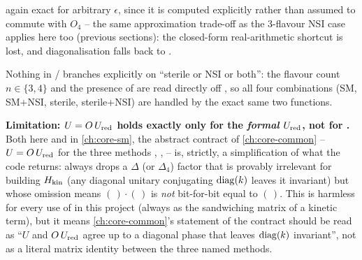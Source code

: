 \begin{theorybox}
\begin{itemize}
\begin{equation}
    \end{equation}
    again exact for arbitrary $\epsilon$, since it is computed explicitly
    rather than assumed to commute with $O_4$ -- the same approximation
    trade-off as the 3-flavour NSI case applies here too (previous
    sections): the closed-form real-arithmetic shortcut is lost, and
    diagonalisation falls back to .
\end{itemize}
Nothing in /
branches explicitly on ``sterile or NSI or both'': the flavour count
$n\in\{3,4\}$ and the presence of  are read directly
off , so all four combinations (SM, SM+NSI,
sterile, sterile+NSI) are handled by the exact same two functions.
\end{theorybox}

\begin{notebox}
\textbf{Limitation: $U=O\,U_{\rm red}$ holds exactly only for the
\emph{formal} $U_{\rm red}$, not for .} Both here and in
\cref{ch:core-sm}, the abstract contract of \cref{ch:core-common} --
$U=O\,U_{\rm red}$ for the three methods ,
,  -- is, strictly, a simplification
of what the code returns:  always drops a $\Delta$ (or
$\Delta_4$) factor that is provably irrelevant for building $H_{\rm kin}$
(any diagonal unitary conjugating $\operatorname{diag}(k)$ leaves it invariant) but whose
omission means $(\,)\cdot$$(\,)$ is
\emph{not} bit-for-bit equal to $(\,)$. This is
harmless for every use of  in this project (always as the
sandwiching matrix of a kinetic term), but it means \cref{ch:core-common}'s
statement of the contract should be read as ``$U$ and $O\,U_{\rm red}$
agree up to a diagonal phase that leaves $\operatorname{diag}(k)$ invariant'', not as a
literal matrix identity between the three named methods.
\end{notebox}

